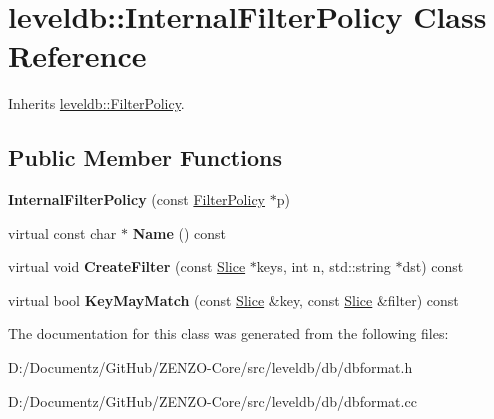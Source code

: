 \hypertarget{classleveldb_1_1_internal_filter_policy}{}\section{leveldb\+::Internal\+Filter\+Policy Class Reference}
\label{classleveldb_1_1_internal_filter_policy}


Inherits \mbox{\hyperlink{classleveldb_1_1_filter_policy}{leveldb\+::\+Filter\+Policy}}.

\subsection*{Public Member Functions}
\begin{DoxyCompactItemize}
\item 
\mbox{\label{classleveldb_1_1_internal_filter_policy_a55469eb6ea941243cd1c65eb14bd8978}} 
{\bfseries Internal\+Filter\+Policy} (const \mbox{\hyperlink{classleveldb_1_1_filter_policy}{Filter\+Policy}} $\ast$p)
\item 
\mbox{\label{classleveldb_1_1_internal_filter_policy_aea56a32a2be2ad99f41c2009af823b44}} 
virtual const char $\ast$ {\bfseries Name} () const
\item 
\mbox{\label{classleveldb_1_1_internal_filter_policy_a0ed8ebb6899c13f90853f61d0e69fbaf}} 
virtual void {\bfseries Create\+Filter} (const \mbox{\hyperlink{classleveldb_1_1_slice}{Slice}} $\ast$keys, int n, std\+::string $\ast$dst) const
\item 
\mbox{\label{classleveldb_1_1_internal_filter_policy_aba61cb2c01f6c1d34128f115903ff559}} 
virtual bool {\bfseries Key\+May\+Match} (const \mbox{\hyperlink{classleveldb_1_1_slice}{Slice}} \&key, const \mbox{\hyperlink{classleveldb_1_1_slice}{Slice}} \&filter) const
\end{DoxyCompactItemize}


The documentation for this class was generated from the following files\+:\begin{DoxyCompactItemize}
\item 
D\+:/\+Documentz/\+Git\+Hub/\+Z\+E\+N\+Z\+O-\/\+Core/src/leveldb/db/dbformat.\+h\item 
D\+:/\+Documentz/\+Git\+Hub/\+Z\+E\+N\+Z\+O-\/\+Core/src/leveldb/db/dbformat.\+cc\end{DoxyCompactItemize}
